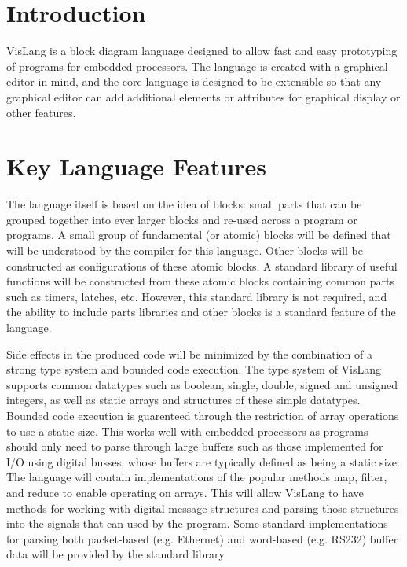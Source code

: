 \section{Introduction}

VisLang is a block diagram language designed to allow fast and
easy prototyping of programs for embedded processors. The language is created
with a graphical editor in mind, and the core language is designed to be extensible
so that any graphical editor can add additional elements or attributes for graphical
display or other features.

\section{Key Language Features}

The language itself is based on the idea of blocks: small parts that can be grouped
together into ever larger blocks and re-used across a program or programs. A small
group of fundamental (or atomic) blocks will be defined that will be understood by the
compiler for this language. Other blocks will be constructed as configurations of
these atomic blocks. A standard library of useful functions will be constructed
from these atomic blocks containing common parts such as timers, latches, etc. However,
this standard library is not required, and the ability to include parts libraries and
other blocks is a standard feature of the language.

Side effects in the produced code will be minimized by the combination of a strong
type system and bounded code execution. The type system of VisLang supports common
datatypes such as boolean, single, double, signed and unsigned integers, as well as
static arrays and structures of these simple datatypes. Bounded code execution is
guarenteed through the restriction of array operations to use a static size. This
works well with embedded processors as programs should only need to parse through
large buffers such as those implemented for I/O using digital busses, whose buffers
are typically defined as being a static size. The language will contain
implementations of the popular methods map, filter, and reduce to enable operating
on arrays. This will allow VisLang to have methods for working with digital message
structures and parsing those structures into the signals that can used by the program.
Some standard implementations for parsing both packet-based (e.g. Ethernet) and word-based
(e.g. RS232) buffer data will be provided by the standard library.

